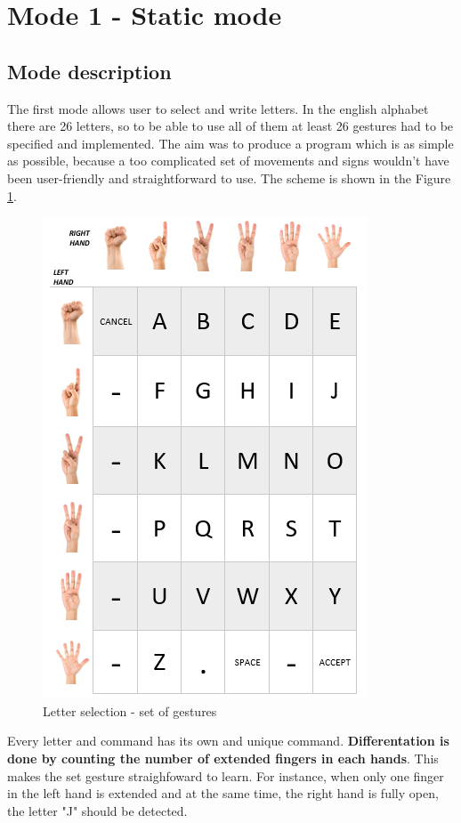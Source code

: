 \section{Mode 1 - Static mode}
\subsection {Mode description}
The first mode allows user to select and write letters. In the english alphabet there are 26 letters, so to be able to use all of them at least 26 gestures had to be specified and implemented. The aim was to produce a program which is as simple as possible, because a too complicated set of movements and signs wouldn't have been user-friendly and straightforward to use. The scheme is shown in the Figure \ref{fig:letters}.

\begin{figure}[H]
	\includegraphics{static_gestures}
	\centering
	\caption{Letter selection - set of gestures}
	\label{fig:letters}
\end{figure}

Every letter and command has its own and unique command. \textbf{Differentation is done by counting the number of extended fingers in each hands}. This makes the set gesture straighfoward to learn. For instance, when only one finger in the left hand is extended and at the same time, the right hand is fully open, the letter "J" should be detected.\\

